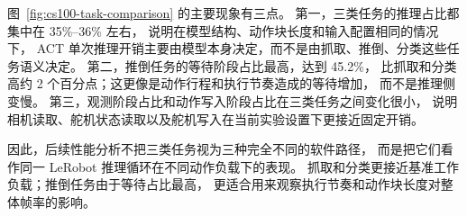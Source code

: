 图~\ref{fig:cs100-task-comparison} 的主要现象有三点。
第一，三类任务的推理占比都集中在 35\%--36\% 左右，
说明在模型结构、动作块长度和输入配置相同的情况下，
ACT 单次推理开销主要由模型本身决定，而不是由抓取、推倒、分类这些任务语义决定。
第二，推倒任务的等待阶段占比最高，达到 45.2\%，
比抓取和分类高约 2 个百分点；这更像是动作行程和执行节奏造成的等待增加，
而不是推理侧变慢。
第三，观测阶段占比和动作写入阶段占比在三类任务之间变化很小，
说明相机读取、舵机状态读取以及舵机写入在当前实验设置下更接近固定开销。

因此，后续性能分析不把三类任务视为三种完全不同的软件路径，
而是把它们看作同一 LeRobot 推理循环在不同动作负载下的表现。
抓取和分类更接近基准工作负载；推倒任务由于等待占比最高，
更适合用来观察执行节奏和动作块长度对整体帧率的影响。


